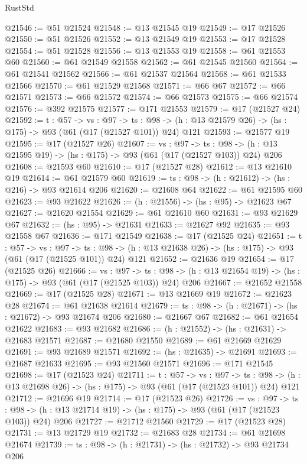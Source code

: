 \begin{lexlean}{RustStd}
\begin{coremodule}
@21546 := @51 @21524
@21548 := @13 @21545 @19
@21549 := @17 @21526
@21550 := @51 @21526
@21552 := @13 @21549 @19
@21553 := @17 @21528
@21554 := @51 @21528
@21556 := @13 @21553 @19
@21558 := @61 @21553 @60
@21560 := @61 @21549 @21558
@21562 := @61 @21545 @21560
@21564 := @61 @21541 @21562
@21566 := @61 @21537 @21564
@21568 := @61 @21533 @21566
@21570 := @61 @21529 @21568
@21571 := @66 @67
@21572 := @66 @21571
@21573 := @66 @21572
@21574 := @66 @21573
@21575 := @66 @21574
@21576 := @392 @21575
@21577 := @171 @21553
@21579 := @17 (@21527 @24)
@21592 := {t : @57} ->
  {vs : @97} ->
  {ts : @98} -> (h : @13 @21579 @26) -> (hs : @175) -> @93 (@61 (@17 (@21527 @101)) @24) @121
@21593 := @21577 @19
@21595 := @17 (@21527 @26)
@21607 := {vs : @97} ->
  {ts : @98} -> (h : @13 @21595 @19) -> (hs : @175) -> @93 (@61 (@17 (@21527 @103)) @24) @206
@21608 := @21593 @60
@21610 := @17 (@21527 @28)
@21612 := @13 @21610 @19
@21614 := @61 @21579 @60
@21619 := {ts : @98} -> (h : @21612) -> (hs : @216) -> @93 @21614 @206
@21620 := @21608 @64
@21622 := @61 @21595 @60
@21623 := @93 @21622
@21626 := (h : @21556) -> (hs : @95) -> @21623 @67
@21627 := @21620 @21554
@21629 := @61 @21610 @60
@21631 := @93 @21629 @67
@21632 := (hs : @95) -> @21631
@21633 := @21627 @92
@21635 := @93 @21558 @67
@21636 := @171 @21549
@21638 := @17 (@21525 @24)
@21651 := {t : @57} ->
  {vs : @97} ->
  {ts : @98} -> (h : @13 @21638 @26) -> (hs : @175) -> @93 (@61 (@17 (@21525 @101)) @24) @121
@21652 := @21636 @19
@21654 := @17 (@21525 @26)
@21666 := {vs : @97} ->
  {ts : @98} -> (h : @13 @21654 @19) -> (hs : @175) -> @93 (@61 (@17 (@21525 @103)) @24) @206
@21667 := @21652 @21558
@21669 := @17 (@21525 @28)
@21671 := @13 @21669 @19
@21672 := @21623 @28
@21674 := @61 @21638 @21614
@21679 := {ts : @98} -> (h : @21671) -> (hs : @21672) -> @93 @21674 @206
@21680 := @21667 @67
@21682 := @61 @21654 @21622
@21683 := @93 @21682
@21686 := (h : @21552) -> (hs : @21631) -> @21683 @21571
@21687 := @21680 @21550
@21689 := @61 @21669 @21629
@21691 := @93 @21689 @21571
@21692 := (hs : @21635) -> @21691
@21693 := @21687 @21633
@21695 := @93 @21560 @21571
@21696 := @171 @21545
@21698 := @17 (@21523 @24)
@21711 := {t : @57} ->
  {vs : @97} ->
  {ts : @98} -> (h : @13 @21698 @26) -> (hs : @175) -> @93 (@61 (@17 (@21523 @101)) @24) @121
@21712 := @21696 @19
@21714 := @17 (@21523 @26)
@21726 := {vs : @97} ->
  {ts : @98} -> (h : @13 @21714 @19) -> (hs : @175) -> @93 (@61 (@17 (@21523 @103)) @24) @206
@21727 := @21712 @21560
@21729 := @17 (@21523 @28)
@21731 := @13 @21729 @19
@21732 := @21683 @28
@21734 := @61 @21698 @21674
@21739 := {ts : @98} -> (h : @21731) -> (hs : @21732) -> @93 @21734 @206

\end{coremodule}
\end{lexlean}
